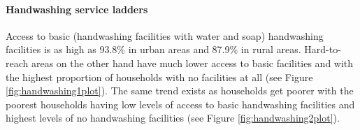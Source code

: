 \documentclass[12pt,a4paper]{article}
\let\oldparagraph\paragraph
\renewcommand{\paragraph}[1]{\oldparagraph{#1}\mbox{}}
\begin{document}
\hypertarget{handwashing-service-ladders}{%
\paragraph{Handwashing service ladders}\label{handwashing-service-ladders}}

Access to basic (handwashing facilities with water and soap) handwashing facilities is as high as 93.8\% in urban areas and 87.9\% in rural areas. Hard-to-reach areas on the other hand have much lower access to basic facilities and with the highest proportion of households with no facilities at all (see Figure \ref{fig:handwashing1plot}). The same trend exists as households get poorer with the poorest households having low levels of access to basic handwashing facilities and highest levels of no handwashing facilities (see Figure \ref{fig:handwashing2plot}).
\end{document}

